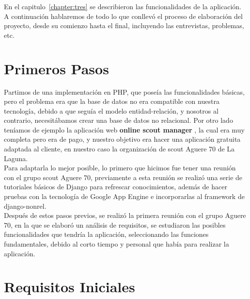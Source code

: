 

En el capitulo~\ref{chapter:tres} se describieron las funcionalidades de la aplicación. A continuación
hablaremos de todo lo que conllevó el proceso de  elaboración del proyecto, desde su comienzo hasta el final,
incluyendo las entrevistas, problemas, etc.



\section{Primeros Pasos}
\label{4:sec1}

Partimos de una implementación en PHP, que poseía las funcionalidades básicas, pero el problema era que la base de datos
no era compatible con nuestra tecnología, debido a que seguía el modelo entidad-relación, y nosotros al contrario, necesitábamos
crear una base de datos no relacional. Por otro lado teníamos de ejemplo la aplicación web \textbf{online scout manager} \cite{URL:OnlineScoutManager}, la cual era muy completa
pero era de pago, y nuestro objetivo era hacer una aplicación gratuita adaptada al cliente, en nuestro caso la organización de scout Aguere 70 de La Laguna.\\

Para adaptarla lo mejor posible, lo primero que hicimos fue tener una reunión con el grupo scout Aguere 70, previamente a esta reunión se realizó una serie de tutoriales
básicos de Django para refrescar conocimientos, además de hacer pruebas con la tecnología de Google App Engine e incorporarlas al framework de django-nonrel.\\ 

Después de estos pasos previos, se realizó la primera reunión con el grupo Aguere 70, en la que se elaboró un análisis de requisitos, se estudiaron las posibles 
funcionalidades que tendría la aplicación, seleccionando las funciones fundamentales, debido al corto tiempo y personal que había para realizar la aplicación.\\

\section{Requisitos Iniciales}
\label{4:sec2}

